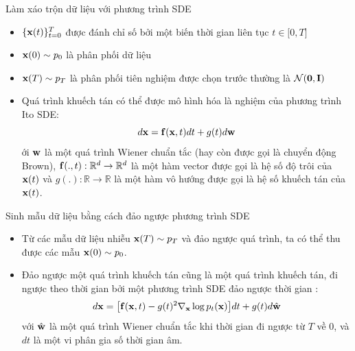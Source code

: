 \documentclass[10pt]{beamer}
\theoremstyle{remark}
\numberwithin{algocf}{section}
\numberwithin{equation}{section}
\numberwithin{dl}{section}
\numberwithin{figure}{section}
\begin{document}
\begin{frame}{Làm xáo trộn dữ liệu với phương trình SDE}
	\begin{itemize}
		\item $\lbrace \bold{x}(t) \rbrace_{t=0}^T$ được đánh chỉ số bởi một biến thời gian liên tục $t \in \lbrack 0, T \rbrack$
		\item $\bold{x}(0) \sim p_0$ là phân phối dữ liệu
		\item $\bold{x}(T) \sim p_T$ là phân phối tiên nghiệm được chọn trước thường là $\mathcal{N}(\bold{0}, \bold{I})$
		\item Quá trình khuếch tán có thể được mô hình hóa là nghiệm của phương trình Ito SDE:
		\begin{equation} \label{eq:5}
			d \bold{x} = \bold{f} (\bold{x}, t) dt + g(t) d \bold{w}
		\end{equation}
		ới $\bold{w}$ là một quá trình Wiener chuẩn tắc (hay còn được gọi là chuyển động Brown), $\bold{f}(.,t): \mathbb{R}^d \rightarrow \mathbb{R}^d$ là một hàm vector được gọi là hệ số độ trôi của $\bold{x}(t)$ và $g(.): \mathbb{R} \rightarrow \mathbb{R}$ là một hàm vô hướng được gọi là hệ số khuếch tán của $\bold{x}(t)$.
	\end{itemize}
\end{frame}

\begin{frame}{Sinh mẫu dữ liệu bằng cách đảo ngược phương trình SDE}
	\begin{itemize}
		\item Từ các mẫu dữ liệu nhiễu $\bold{x}(T) \sim p_T$ và đảo ngược quá trình, ta có thể thu được các mẫu $\bold{x}(0) \sim p_0$.
		\item Đảo ngược một quá trình khuếch tán cũng là một quá trình khuếch tán, đi ngược theo thời gian bởi một phương trình SDE đảo ngược thời gian \citep{anderson1982reverse}:
		\begin{equation} \label{eq:6}
			d \bold{x} = \big \lbrack \bold{f}(\bold{x}, t) - g(t)^2 \nabla_{\bold{x}} \log p_t (\bold{x}) \big \rbrack dt + g(t) d \hat{\bold{w}}
		\end{equation}
		với $\hat{\bold{w}}$ là một quá trình Wiener chuẩn tắc khi thời gian đi ngược từ $T$ về $0$, và $dt$ là một vi phân gia số thời gian âm.
	\end{itemize}
\end{frame}
\end{document}
